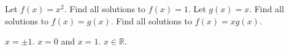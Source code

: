 \documentclass{article}
\begin{document}
    \createtitle

    \begin{problem}
	\label{easyProblem}
	Let $f(x) = x^2$.
	\subproblem \label{easySubproblem} Find all solutions to $f(x) = 1$.
	\exitsubproblems
	Let $g(x) = x$.
	\subproblem Find all solutions to $f(x) = g(x)$.
	\subproblem Find all solutions to $f(x) = x g(x)$.
    \end{problem}

    \newpageifproblems

    \begin{solution}
	\subproblem $x = \pm 1$.
	\subproblem $x = 0$ and $x = 1$.
	\subproblem $x \in \mathbb{R}$.
    \end{solution}
\end{document}
